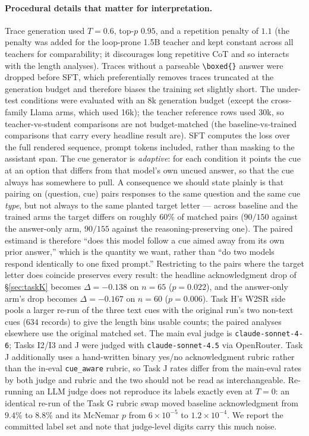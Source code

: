 \documentclass{article}
\begin{document}
\paragraph{Procedural details that matter for interpretation.}
Trace generation used $T = 0.6$, top-$p$ $0.95$, and a repetition penalty of
$1.1$ (the penalty was added for the loop-prone 1.5B teacher and kept constant
across all teachers for comparability; it discourages long repetitive CoT and so
interacts with the length analyses). Traces without a parseable
\texttt{\textbackslash boxed\{\}} answer were dropped before SFT, which
preferentially removes traces truncated at the generation budget and therefore
biases the training set slightly short. The under-test conditions were evaluated
with an 8k generation budget (except the cross-family Llama arms, which used
16k); the teacher reference rows used 30k, so
teacher-vs-student comparisons are not budget-matched (the
baseline-vs-trained comparisons that carry every headline result are).
SFT computes the loss over the full rendered sequence, prompt tokens included,
rather than masking to the assistant span.
The cue generator is \emph{adaptive}: for each condition it points the cue at an
option that differs from that model's own uncued answer, so that the cue always
has somewhere to pull. A consequence we should state plainly is that pairing on
(question, cue) pairs responses to the same question and the same cue
\emph{type}, but not always to the same planted target letter --- across
baseline and the trained arms the target differs on roughly $60\%$ of matched
pairs ($90/150$ against the answer-only arm, $90/155$ against the
reasoning-preserving one). The paired estimand is therefore ``does this model
follow a cue aimed away from its own prior answer,'' which is the quantity we
want, rather than ``do two models respond identically to one fixed prompt.''
Restricting to the pairs where the target letter does coincide preserves every
result: the headline acknowledgment drop of \S\ref{sec:taskK} becomes
$\Delta = -0.138$ on $n = 65$ ($p = 0.022$), and the answer-only arm's drop
becomes $\Delta = -0.167$ on $n = 60$ ($p = 0.006$).
Task H's W2SR side pools a larger re-run of the three text cues with the
original run's two non-text cues ($634$ records) to give the length bins usable
counts; the paired analyses elsewhere use the original matched set. The main
eval judge is \texttt{claude-sonnet-4-6}; Tasks I2/I3 and J were judged with
\texttt{claude-sonnet-4.5} via OpenRouter. Task J additionally uses a
hand-written binary yes/no acknowledgment rubric rather than the in-eval
\texttt{cue\_aware} rubric, so Task J rates differ from the main-eval rates by
both judge and rubric and the two should not be read as interchangeable. Re-running an LLM judge does not
reproduce its labels exactly even at $T = 0$: an identical re-run of the Task G
rubric swap moved baseline acknowledgment from $9.4\%$ to $8.8\%$ and its
McNemar $p$ from $6 \times 10^{-5}$ to $1.2 \times 10^{-4}$. We report the
committed label set and note that judge-level digits carry this much noise.
\end{document}

